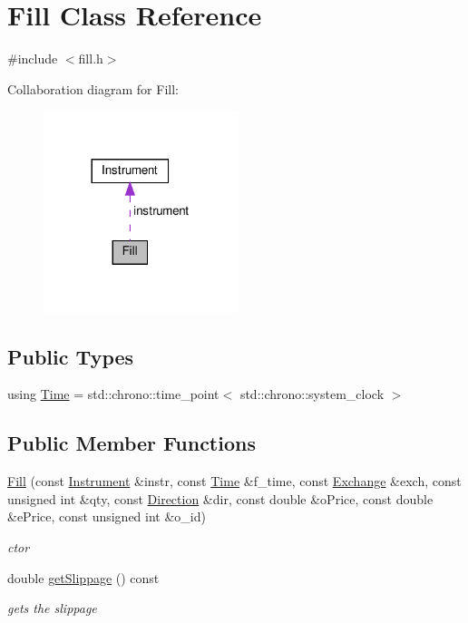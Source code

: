 \hypertarget{classFill}{}\section{Fill Class Reference}
\label{classFill}


{\ttfamily \#include $<$fill.\+h$>$}



Collaboration diagram for Fill\+:
\nopagebreak
\begin{figure}[H]
\begin{center}
\leavevmode
\includegraphics[width=161pt]{classFill__coll__graph}
\end{center}
\end{figure}
\subsection*{Public Types}
\begin{DoxyCompactItemize}
\item 
using \hyperlink{classFill_ab2f91079415160baf6bae4ce4e651882}{Time} = std\+::chrono\+::time\+\_\+point$<$ std\+::chrono\+::system\+\_\+clock $>$
\end{DoxyCompactItemize}
\subsection*{Public Member Functions}
\begin{DoxyCompactItemize}
\item 
\hyperlink{classFill_ac7abcfc5d69d92624d820ac2c54b26a9}{Fill} (const \hyperlink{classInstrument}{Instrument} \&instr, const \hyperlink{classFill_ab2f91079415160baf6bae4ce4e651882}{Time} \&f\+\_\+time, const \hyperlink{fill_8h_a0735734beae0a6b094ce815e727eeca0}{Exchange} \&exch, const unsigned int \&qty, const \hyperlink{fill_8h_a224b9163917ac32fc95a60d8c1eec3aa}{Direction} \&dir, const double \&o\+Price, const double \&e\+Price, const unsigned int \&o\+\_\+id)
\begin{DoxyCompactList}\small\item\em ctor \end{DoxyCompactList}\item 
double \hyperlink{classFill_afc13ac8bde0a76cb798f5fc9a62014fd}{get\+Slippage} () const
\begin{DoxyCompactList}\small\item\em gets the slippage \end{DoxyCompactList}\end{DoxyCompactItemize}
